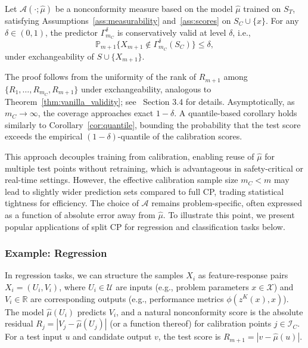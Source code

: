\begin{theorem}
\label{thm:split_validity}
Let $\mathcal{A}(\cdot; \hat{\mu})$ be a nonconformity measure based on the model $\hat{\mu}$ trained on $S_T$, satisfying Assumptions~\ref{ass:measurability} and~\ref{ass:scores} on $S_C \cup \{x\}$. For any $\delta \in (0,1)$, the predictor $\Gamma^\delta_{m_C}$ is conservatively valid at level $\delta$, i.e.,
\[
\mathbb{P}_{m+1} \big\{ X_{m+1} \notin \Gamma^\delta_{m_C}(S_C) \big\} \le \delta,
\]
under exchangeability of $S \cup \{X_{m+1}\}$.
\end{theorem}

The proof follows from the uniformity of the rank of $R_{m+1}$ among $\{R_1, \ldots, R_{m_C}, R_{m+1}\}$ under exchangeability, analogous to Theorem~\ref{thm:vanilla_validity}; see~\cite{Angelopoulos2025} Section 3.4 for details. Asymptotically, as $m_C \to \infty$, the coverage approaches exact $1-\delta$. A quantile-based corollary holds similarly to Corollary~\ref{cor:quantile}, bounding the probability that the test score exceeds the empirical $(1-\delta)$-quantile of the calibration scores.

This approach decouples training from calibration, enabling reuse of $\hat{\mu}$ for multiple test points without retraining, which is advantageous in safety-critical or real-time settings. However, the effective calibration sample size $m_C < m$ may lead to slightly wider prediction sets compared to full CP, trading statistical tightness for efficiency. The choice of $\mathcal{A}$ remains problem-specific, often expressed as a function of absolute error away from $\hat{\mu}$. To illustrate this point, we present popular applications of split CP for regression and classification tasks below.

\subsubsection{Example: Regression}
\label{subsec:regression}

In regression tasks, we can structure the samples $X_i$ as feature-response pairs  $X_i = (U_i, V_i)$, where $U_i \in \mathcal{U}$ are inputs (e.g., problem parameters $x \in \mathcal{X}$) and $V_i \in \mathbb{R}$ are corresponding outputs (e.g., performance metrics $\phi(z^K(x),x)$). The model $\hat{\mu}(U_i)$ predicts $V_i$, and a natural nonconformity score is the absolute residual $R_j = |V_j - \hat{\mu}(U_j)|$ (or a function thereof) for calibration points $j \in \mathcal{I}_C$. For a test input $u$ and candidate output $v$, the test score is $R_{m+1} = |v - \hat{\mu}(u)|$.

